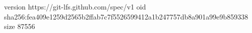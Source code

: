 version https://git-lfs.github.com/spec/v1
oid sha256:fea409e1259d2565b2ffab7c7f5526599412a1b247757db8a901a99e9b859338
size 87556
